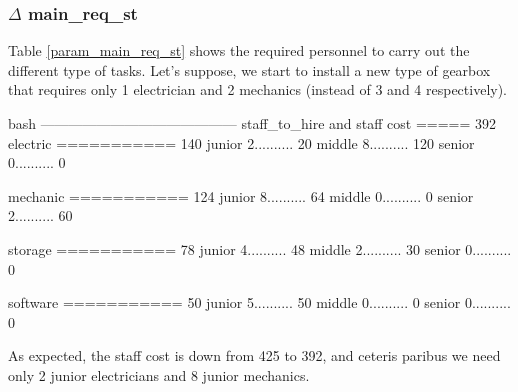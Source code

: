     \subsubsection{$\Delta$ main\_req\_st}
    Table \ref{param_main_req_st} shows the required personnel to carry out the different type of 
    tasks. Let's suppose, we start to install a new type of gearbox that requires only 1 electrician
    and 2 mechanics (instead of 3 and 4 respectively). \bigskip
    \newline
        \vspace{2pt}
        \begin{boxminted}{bash}
            ------------------------------------------
            staff_to_hire and staff cost ===== 392
            electric   =========== 140
            junior     2.......... 20
            middle     8.......... 120
            senior     0.......... 0
            
            mechanic   =========== 124
            junior     8.......... 64
            middle     0.......... 0
            senior     2.......... 60
            
            storage   =========== 78
            junior     4.......... 48
            middle     2.......... 30
            senior     0.......... 0
            
            software   =========== 50
            junior     5.......... 50
            middle     0.......... 0
            senior     0.......... 0            
        \end{boxminted}
    \newline
    As expected, the staff cost is down from 425 to 392, and ceteris paribus we need only 
    2 junior electricians and 8 junior mechanics.

